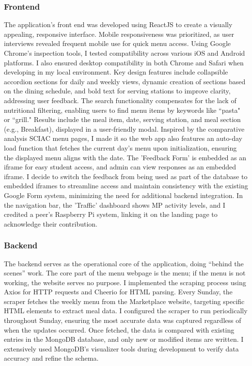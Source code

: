 \documentclass[10pt,twocolumn]{article}
\begin{document}
\subsubsection{Frontend}

The application's front end was developed using ReactJS to create a visually appealing, responsive interface. Mobile responsiveness was prioritized, as user interviews revealed frequent mobile use for quick menu access. Using Google Chrome's inspection tools, I tested compatibility across various iOS and Android platforms. I also ensured desktop compatibility in both Chrome and Safari when developing in my local environment. Key design features include collapsible accordion sections for daily and weekly views, dynamic creation of sections based on the dining schedule, and bold text for serving stations to improve clarity, addressing user feedback. The search functionality compensates for the lack of nutritional filtering, enabling users to find menu items by keywords like ``pasta" or ``grill." Results include the meal item, date, serving station, and meal section (e.g., Breakfast), displayed in a user-friendly modal. Inspired by the comparative analysis SCIAC menu pages, I made it so the web app also features an auto-day load function that fetches the current day's menu upon initialization, ensuring the displayed menu aligns with the date. The 'Feedback Form' is embedded as an iframe for easy student access, and admin can view responses as an embedded iframe. I decide to switch the feedback from being used as part of the database to embedded iframes to streamline access and maintain consistency with the existing Google Form system, minimizing the need for additional backend integration. In the navigation bar, the 'Traffic' dashboard shows MP activity levels, and I credited a peer’s Raspberry Pi system, linking it on the landing page to acknowledge their contribution.

\subsubsection{Backend}
The backend serves as the operational core of the application, doing “behind the scenes” work. The core part of the menu webpage is the menu; if the menu is not working, the website serves no purpose. I implemented the scraping process using Axios for HTTP requests and Cheerio for HTML parsing. Every Sunday, the scraper fetches the weekly menu from the Marketplace website, targeting specific HTML elements to extract meal data. I configured the scraper to run periodically throughout Sunday, ensuring the most accurate data was captured regardless of when the updates occurred. Once fetched, the data is compared with existing entries in the MongoDB database, and only new or modified items are written. I extensively used MongoDB’s visualizer tools during development to verify data accuracy and refine the schema.
\end{document}
